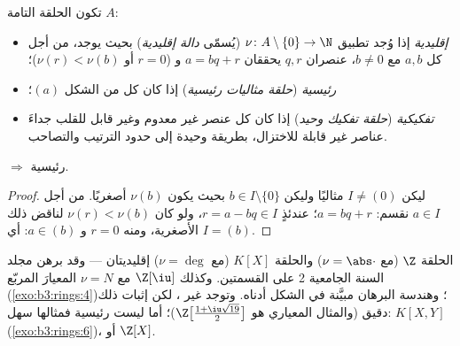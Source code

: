 \begin{definition}\label{def:b3:rings:pidufd}
تكون الحلقة التامة $A$:
\begin{itemize}
  \item \emph{إقليدية} إذا وُجد تطبيق $\nu \colon A \setminus \{0\} \to \N$
        (يُسمّى \emph{دالة إقليدية}) بحيث يوجد، من أجل كل
        $a, b$ مع $b \ne 0$، عنصران $q, r$ يحققان $a = bq + r$
        و ($r = 0$ أو $\nu(r) <
        \nu(b)$)؛
  \item \emph{رئيسية} (\emph{حلقة مثاليات رئيسية}) إذا كان كل  من الشكل $(a)$؛
  \item \emph{تفكيكية} (\emph{حلقة تفكيك وحيد}) إذا كان كل عنصر غير معدوم وغير قابل للقلب جداءَ
        عناصر غير قابلة للاختزال، بطريقة وحيدة إلى حدود الترتيب
        والتصاحب.
\end{itemize}
\end{definition}

\begin{theorem}\label{thm:b3:rings:euclideanpid}
 $\Rightarrow$ رئيسية.
\end{theorem}

\begin{proof}
ليكن $I \neq (0)$ مثاليًا وليكن $b \in I \setminus\{0\}$ بحيث يكون $\nu(b)$
أصغريًا. من أجل $a \in I$ نقسم: $a = bq + r$؛ عندئذٍ $r = a
- bq \in I$،
ولو كان $\nu(r) < \nu(b)$ لناقض ذلك الأصغرية، ومنه $r = 0$ و $a \in (b)$:
أي $I = (b)$.
\end{proof}

\begin{example}\label{ex:b3:rings:euclidean}
الحلقة $\Z$ (مع $\nu = \abs\cdot$) والحلقة $K[X]$ (مع $\nu = \deg$)
إقليديتان --- وقد برهن مجلد السنة الجامعية 2 على القسمتين. وكذلك
$\Z[\iu]$ مع $\nu = N$ المعيارَ المربّع (\cref{exo:b3:rings:4})؛ وهندسة
البرهان مبيَّنة في الشكل أدناه. وتوجد  غير
، لكن إثبات ذلك دقيق (والمثال المعياري هو $\Z\bigl[\frac{1+\iu\sqrt{19}}2\bigr]$)؛ أما
 ليست رئيسية فمثالها سهل: $K[X, Y]$
(\cref{exo:b3:rings:6})، أو $\Z[X]$.
\end{example}


